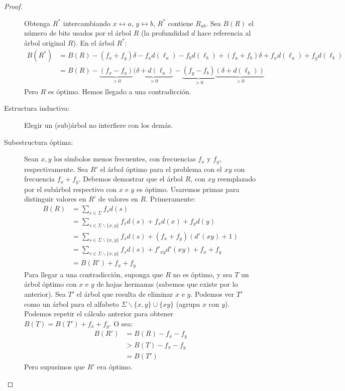 \begin{proof}
\begin{description}
      Obtenga \(R^*\)
      intercambiando \(x\leftrightarrow a\), \(y\leftrightarrow b\),
      \(R^*\) contiene \(R_{a b}\).
      Sea \(B(R)\) el número de bits usados por el árbol \(R\)
      (la profundidad \(d\) hace referencia al árbol original \(R\)).
       En el árbol \(R^*\):
       \begin{align*}
         B(R^*)
           &= B(R) - (f_x + f_y) \delta
                   - f_a d(\ell_a)
                   - f_b d(\ell_b)
                   + (f_a + f_b) \delta
                   + f_x d(\ell_a) + f_y d(\ell_b) \\
           &= B(R) - \underbrace{(f_x-f_a)}_{> 0}
                     \underbrace{(\delta +d(\ell_a)}_{> 0}
                   - \underbrace{(f_y - f_b)}_{> 0}
                     \underbrace{(\delta + d(\ell_b))}_{> 0}
       \end{align*}
       Pero \(R\) es óptimo.
       Hemos llegado a una contradicción.
    \item[Estructura inductiva:]
      Elegir un (sub)árbol no interfiere con los demás.
    \item[Subestructura óptima:]
      Sean \(x, y\) los símbolos menos frecuentes,
      con frecuencias \(f_x\) y \(f_y\),
      respectivamente.
      Sea \(R'\) el árbol óptimo para el problema con el 
      \(x y\) con frecuencia \(f_x + f_y\).
      Debemos demostrar que el árbol \(R\),
      con \(x y\) reemplazado por el subárbol respectivo con \(x\) e \(y\)
      es óptimo.
      Usaremos primas para distinguir valores en \(R'\) de valores en \(R\).
      Primeramente:
      \begin{align*}
        B(R)
          &= \sum_{s \in \Sigma} f_s d(s) \\
          &= \sum_{s \in \Sigma \smallsetminus \{ x, y \}} f_s d(s)
               + f_x d(x) + f_y d(y) \\
          &= \sum_{s \in \Sigma \smallsetminus \{ x, y \}} f_s d(s)
               + (f_x + f_y) (d'(x y) + 1) \\
          &= \sum_{s \in \Sigma \smallsetminus \{ x, y \}} f_s d(s)
               + f'_{x y} d'(x y) + f_x + f_y \\
          &= B(R') + f_x + f_y
      \end{align*}
      Para llegar a una contradicción,
      suponga que \(R\) no es óptimo,
      y sea \(T\) un árbol óptimo con \(x\) e \(y\) de hojas hermanas
      (sabemos que existe por lo anterior).
      Sea \(T'\) el árbol que resulta de eliminar \(x\) e \(y\).
      Podemos ver \(T'\) como un árbol
      para el alfabeto \(\Sigma \smallsetminus \{ x, y \} \cup \{ x y \}\)
      (agrupa \(x\) con \(y\)).
      Podemos repetir el cálculo anterior para obtener
      \(B(T) = B(T') + f_x + f_y\).
      O sea:
      \begin{align*}
        B(R')
          &= B(R) - f_x - f_y \\
          &> B(T) - f_x - f_y \\
          &= B(T')
      \end{align*}
      Pero supusimos que \(R'\) era óptimo.
    \end{description}
  \end{proof}
